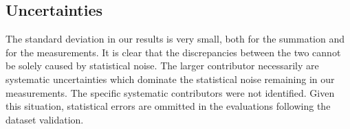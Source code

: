 \subsection{Uncertainties}
 The standard deviation in our results is very small, both for the summation and for the measurements. It is clear that the discrepancies between the two cannot be solely caused by statistical noise. The larger contributor necessarily are systematic uncertainties which dominate the statistical noise remaining in our measurements. The specific systematic contributors were not identified. Given this situation, statistical errors are ommitted in the evaluations following the dataset validation.

\setcounter{savedpage}{\value{page}}






\setcounter{page}{\numexpr\value{savedpage}+3\relax}


